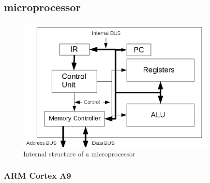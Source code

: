 \subsection{microprocessor}
\begin{figure}[htbp]
\begin{center}
\includegraphics[width=10cm,keepaspectratio=true]{bilder/png/microprocessorblockdiagram}
\caption{Internal structure of a microprocessor}
\label{fig:microprocessorblockdiagram}
\end{center}
\end{figure}
\subsubsection{ARM Cortex A9}
